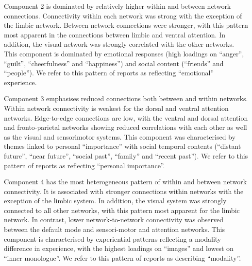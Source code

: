 Component 2 is dominated by relatively higher within and between network connections. Connectivity within each network was strong with the exception of the limbic network. Between network connections were stronger, with this pattern most apparent in the connections between limbic and ventral attention. In addition, the visual network was strongly correlated with the other networks. This component is dominated by emotional responses (high loadings on “anger”, “guilt”, “cheerfulness” and “happiness”) and social content (“friends” and “people”). We refer to this pattern of reports as reflecting “emotional” experience.

Component 3 emphasises reduced connections both between and within networks. Within network connectivity is weakest for the dorsal and ventral attention networks. Edge-to-edge connections are low, with the ventral and dorsal attention and fronto-parietal networks showing reduced correlations with each other as well as the visual and sensorimotor systems. This component was characterised by themes linked to personal “importance” with social temporal contents (“distant future”, “near future”, “social past”, “family” and “recent past”). We refer to this pattern of reports as reflecting “personal importance”.

Component 4 has the most heterogeneous pattern of within and between network connectivity. It is associated with stronger connections within networks with the exception of the limbic system. In addition, the visual system was strongly connected to all other networks, with this pattern most apparent for the limbic network. In contrast, lower network-to-network connectivity was observed between the default mode and sensori-motor and attention networks. This component is characterised by experiential patterns reflecting a modality difference in experience, with the highest loadings on “images” and lowest on “inner monologue”. We refer to this pattern of reports as describing “modality”.


